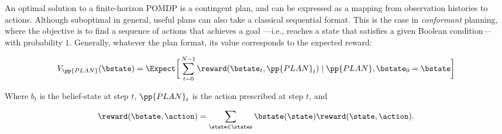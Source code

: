 An optimal solution to a finite-horizon POMDP is a contingent plan,
and can be expressed as a mapping from observation histories to
actions. Although suboptimal in general, useful plans can also take a
classical sequential format. This is the case in {\em conformant}
planning, where the objective is to find a sequence of actions that
achieves a goal ---i.e., reaches a state that satisfies a given
Boolean condition--- with probability $1$.  Generally, whatever the
plan format, its value corresponds to the expected reward:


\begin{equation}\label{eq:expectedvalue}
V_{\pp{PLAN}}(\bstate) = \Expect \bigg{[} 
\sum_{t=0}^{N-1}  \reward(\bstate_t, \pp{PLAN}_t) \mid \pp{PLAN}, \bstate_0 = \bstate \bigg{]}
\end{equation}

\noindent Where $b_t$ is the belief-state at step $t$, $\pp{PLAN}_t$ is
the action prescribed at step $t$, and

\[\reward(\bstate, \action) = \sum_{\state \in \states}
\bstate(\state)\reward(\state, \action).\] 


